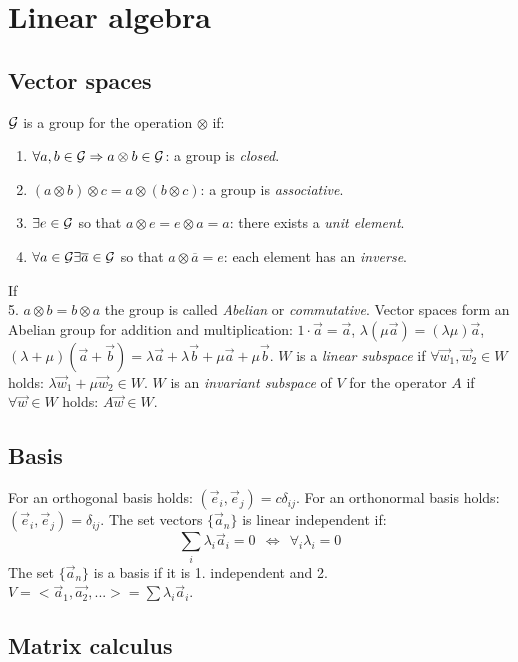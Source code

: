 \chapter{Linear algebra}
\section{Vector spaces}
$\cal G$ is a group for the operation $\otimes$ if:
\begin{enumerate}
\item $\forall a,b\in{\cal G}\Rightarrow a\otimes b\in\cal G$: a group is
      {\it closed}.
\item $(a\otimes b)\otimes c = a\otimes (b\otimes c)$: a group is
      {\it associative}.
\item $\exists e\in{\cal G}$ so that $a\otimes e=e\otimes a=a$: there exists a
      {\it unit element}.
\item $\forall a\in{\cal G}\exists \overline{a}\in{\cal G}$ so that $a\otimes\overline{a}=e$:
      each element has an {\it inverse}.
\end{enumerate}
If\\
\hspace*{4.5mm}5. $a\otimes b=b\otimes a$
\npar
the group is called {\it Abelian} or {\it commutative}.
Vector spaces form an Abelian group for addition and multiplication:
$1\cdot\vec{a}=\vec{a}$, $\lambda(\mu\vec{a})=(\lambda\mu)\vec{a}$,
$(\lambda+\mu)(\vec{a}+\vec{b})=\lambda\vec{a}+\lambda\vec{b}+\mu\vec{a}+\mu\vec{b}$.
\npar
$W$ is a {\it linear subspace} if $\forall \vec{w}_1,\vec{w}_2\in W$
holds: $\lambda\vec{w}_1+\mu\vec{w}_2\in W$.
\npar
$W$ is an {\it invariant subspace} of $V$ for the operator $A$ if
$\forall\vec{w}\in W$ holds: $A\vec{w}\in W$.

\section{Basis}
For an orthogonal basis holds: $(\vec{e}_i,\vec{e}_j)=c\delta_{ij}$. For an
orthonormal basis holds:  $(\vec{e}_i,\vec{e}_j)=\delta_{ij}$.
\npar
The set vectors $\{\vec{a}_n\}$ is linear independent if:
\[
\sum\limits_i\lambda_i\vec{a}_i=0~~\Leftrightarrow~~\forall_i\lambda_i=0
\]
The set $\{\vec{a}_n\}$ is a basis if it is 1. independent and 2.
$V=<\vec{a}_1,\vec{a_2},...>=\sum\lambda_i\vec{a}_i$.

\section{Matrix calculus}
